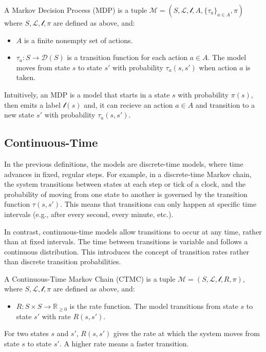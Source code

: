 \begin{definition}
    A Markov Decision Process (MDP) is a tuple $\mathcal{M} = (S, \mathcal{L}, \mathcal{l}, A, \{\tau_a\}_{a \in A}, \pi)$ where $S, \mathcal{L}, \mathcal{l}, \pi$ are defined as above, and:
    \begin{itemize}
        \item $A$ is a finite nonempty set of actions.
        \item $\tau_a: S \rightarrow \mathcal{D}(S)$ is a transition function for each action $a \in A$. The model moves from state $s$ to state $s'$ with probability $\tau_a(s, s')$ when action $a$ is taken.
    \end{itemize}
\end{definition}

Intuitively, an MDP is a model that starts in a state $s$ with probability $\pi(s)$, then emits a label $\mathcal{l}(s)$ and, it can recieve an action $a \in A$ and transition to a new state $s'$ with probability $\tau_a(s, s')$. 

\subsection{Continuous-Time}
In the previous definitions, the models are discrete-time models, where time advances in fixed, regular steps. For example, in a discrete-time Markov chain, the system transitions between states at each step or tick of a clock, and the probability of moving from one state to another is governed by the transition function $\tau(s, s')$. This means that transitions can only happen at specific time intervals (e.g., after every second, every minute, etc.).

In contrast, continuous-time models allow transitions to occur at any time, rather than at fixed intervals. The time between transitions is variable and follows a continuous distribution. This introduces the concept of transition rates rather than discrete transition probabilities.

\begin{definition}
    A Continuous-Time Markov Chain (CTMC) is a tuple $\mathcal{M} = (S, \mathcal{L}, \mathcal{l}, R, \pi)$, where $S, \mathcal{L}, \mathcal{l}, \pi$ are defined as above, and:
    \begin{itemize}
        \item $R: S \times S \rightarrow \mathbb{R}_{\geq 0}$ is the rate function. The model transitions from state $s$ to state $s'$ with rate $R(s, s')$.
    \end{itemize}
\end{definition}
For two states $s$ and $s'$, $R(s, s')$ gives the rate at which the system moves from state $s$ to state $s'$. A higher rate means a faster transition.

